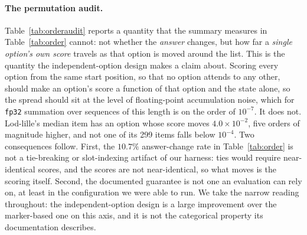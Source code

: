 \documentclass[11pt]{article}
\begin{document}
\paragraph{The permutation audit.} Table~\ref{tab:orderaudit} reports a quantity
that the summary measures in Table~\ref{tab:order} cannot: not whether the
\emph{answer} changes, but how far a \emph{single option's own score} travels as
that option is moved around the list. This is the quantity the independent-option
design makes a claim about. Scoring every option from the same start position, so
that no option attends to any other, should make an option's score a function of
that option and the state alone, so the spread should sit at the level of
floating-point accumulation noise, which for
\texttt{fp32} summation over sequences of this length is on the order of
$10^{-7}$. It does not. Lod-lille's median item has an option whose score moves
$4.0 \times 10^{-2}$, five orders of magnitude higher, and not one of its 299
items falls below $10^{-4}$. Two consequences follow. First, the $10.7\%$
answer-change rate in Table~\ref{tab:order} is not a tie-breaking or
slot-indexing artifact of our harness: ties would require near-identical scores,
and the scores are not near-identical, so what moves is the scoring itself.
Second, the documented guarantee is not one an evaluation can rely on, at least in
the configuration we were able to run. We take the narrow reading throughout: the
independent-option design is a large improvement over the marker-based one on this
axis, and it is not the categorical property its documentation describes.
\end{document}
